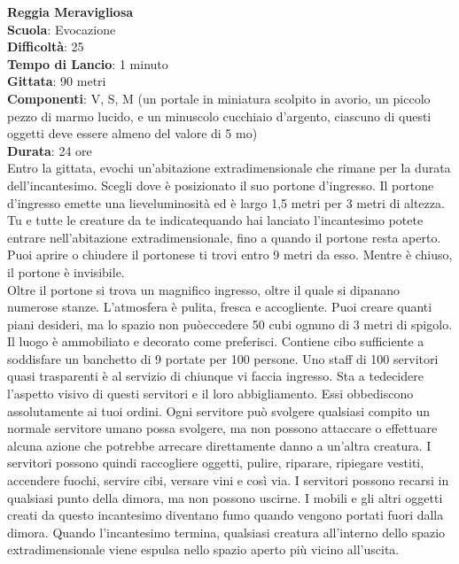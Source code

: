 \begin{multicols}{2}
\medskip\textbf{Reggia Meravigliosa}\\
\textbf{Scuola}: Evocazione\\
\textbf{Difficoltà}:  25\\
\textbf{Tempo di Lancio}: 1 minuto\\
\textbf{Gittata}: 90 metri\\
\textbf{Componenti}: V, S, M (un portale in miniatura scolpito in avorio, un piccolo pezzo di marmo lucido, e un minuscolo cucchiaio d’argento, ciascuno di questi oggetti deve essere almeno del valore di 5 mo)\\
\textbf{Durata}: 24 ore\\
Entro la gittata, evochi un'abitazione extradimensionale che rimane per la durata dell'incantesimo. Scegli dove è posizionato il suo portone d’ingresso. Il portone d’ingresso emette una lieveluminosità ed è largo 1,5  metri per 3 metri di altezza. Tu e tutte le creature da te indicatequando hai lanciato l'incantesimo potete  entrare nell'abitazione extradimensionale, fino a quando il portone resta aperto. Puoi aprire o chiudere il portonese ti trovi entro 9 metri da esso.  Mentre è chiuso, il portone è invisibile.\\
Oltre il portone si trova un magnifico ingresso, oltre il quale si dipanano numerose stanze. L’atmosfera è pulita, fresca e accogliente. Puoi creare quanti piani desideri, ma lo spazio non puòeccedere 50 cubi ognuno di 3 metri di spigolo. Il luogo è ammobiliato e decorato come  preferisci. Contiene cibo sufficiente a soddisfare un banchetto di 9 portate per 100 persone. Uno staff di 100 servitori quasi trasparenti è al servizio di chiunque vi faccia ingresso. Sta a tedecidere l’aspetto visivo di questi servitori e il loro abbigliamento. Essi obbediscono  assolutamente ai tuoi ordini. Ogni servitore può svolgere qualsiasi compito un normale servitore umano possa svolgere, ma non possono attaccare o effettuare alcuna azione che potrebbe arrecare direttamente danno a un'altra creatura. I servitori possono quindi raccogliere oggetti, pulire, riparare, ripiegare vestiti, accendere fuochi, servire cibi, versare vini e così via. I servitori possono recarsi in qualsiasi punto della dimora, ma non possono uscirne. I mobili e gli altri oggetti creati da questo incantesimo diventano fumo quando vengono portati fuori dalla dimora. Quando l'incantesimo termina, qualsiasi creatura all'interno dello spazio extradimensionale viene espulsa nello spazio aperto più vicino all'uscita.


\end{multicols}
